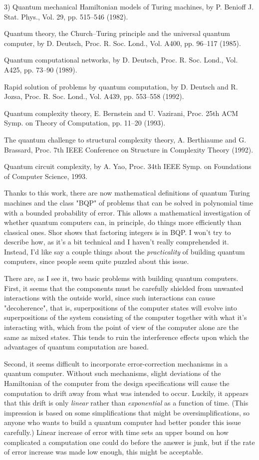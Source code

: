 3) Quantum mechanical Hamiltonian models of Turing machines, by P.
Benioff J. Stat. Phys., Vol. 29, pp. 515--546 (1982).

Quantum theory, the Church--Turing principle and the universal quantum
computer, by D. Deutsch, Proc. R. Soc. Lond., Vol. A400, pp. 96--117
(1985).

Quantum computational networks, by D. Deutsch, Proc. R. Soc. Lond.,
Vol. A425, pp. 73--90 (1989).

Rapid solution of problems by quantum computation, by D. Deutsch
and R. Jozsa, Proc. R. Soc. Lond., Vol. A439, pp. 553--558 (1992).

Quantum complexity theory, E. Bernstein and U. Vazirani,
Proc. 25th ACM Symp. on Theory of Computation, pp. 11--20
(1993).

The quantum challenge to structural complexity theory, A. Berthiaume and
G.  Brassard, Proc. 7th IEEE Conference on Structure in Complexity
Theory (1992).

Quantum circuit complexity, by A. Yao, Proc. 34th IEEE Symp. on
Foundations of Computer Science, 1993.


Thanks to this work, there are now mathematical definitions of quantum
Turing machines and the class "BQP" of problems that can be solved in
polynomial time with a bounded probability of error.  This allows a
mathematical investigation of whether quantum computers can, in
principle, do things more efficiently than classical ones.  Shor shows
that factoring integers is in BQP.  I won't try to describe how, as it's
a bit technical and I haven't really comprehended it.  Instead, I'd like
say a couple things about the \emph{practicality} of building quantum
computers, since people seem quite puzzled about this issue.  

There are, as I see it, two basic problems with building quantum
computers.  First, it seems that the components must be carefully
shielded from unwanted interactions with the outside world, since such
interactions can cause "decoherence", that is, superpositions of the
computer states will evolve into superpositions of the system consisting
of the computer together with what it's interacting with, which from the
point of view of the computer alone are the same as mixed states.  This
tends to ruin the interference effects upon which the advantages of
quantum computation are based.  

Second, it seems difficult to incorporate error-correction mechanisms in
a quantum computer.  Without such mechanisms, slight deviations of the
Hamiltonian of the computer from the design specifications will cause
the computation to drift away from what was intended to occur.  Luckily,
it appears that this drift is only \emph{linear} rather than \emph{exponential} as
a function of time.  (This impression is based on some simplifications
that might be oversimplifications, so anyone who wants to build a
quantum computer had better ponder this issue carefully.)  Linear
increase of error with time sets an upper bound on how complicated a
computation one could do before the answer is junk, but if the rate of
error increase was made low enough, this might be acceptable.  

